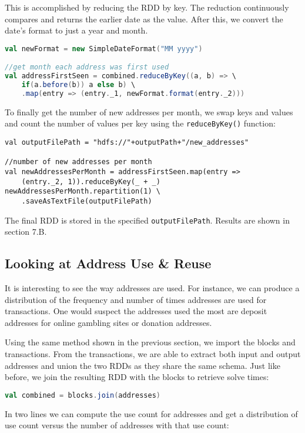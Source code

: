 \documentclass[9pt,twocolumn,twoside]{idsi}
\begin{document}
This is accomplished by reducing the RDD by key. The reduction continuously compares and returns the earlier date as the value. After this, we convert the date's format to just a year and month.

\begin{lstlisting}[language=Scala]
val newFormat = new SimpleDateFormat("MM yyyy")

//get month each address was first used
val addressFirstSeen = combined.reduceByKey((a, b) => \
    if(a.before(b)) a else b) \
    .map(entry => (entry._1, newFormat.format(entry._2)))
\end{lstlisting}

To finally get the number of new addresses per month, we swap keys and values and count the number of values per key using the \lstinline{reduceByKey()} function:

\begin{lstlisting}
val outputFilePath = "hdfs://"+outputPath+"/new_addresses"

//number of new addresses per month
val newAddressesPerMonth = addressFirstSeen.map(entry =>
    (entry._2, 1)).reduceByKey(_ + _)
newAddressesPerMonth.repartition(1) \
    .saveAsTextFile(outputFilePath)
\end{lstlisting}

The final RDD is stored in the specified \lstinline{outputFilePath}. Results are shown in section 7.B.

\subsection{Looking at Address Use \& Reuse}
It is interesting to see the way addresses are used. For instance, we can produce a distribution of the frequency and number of times addresses are used for transactions. One would suspect the addresses used the most are deposit addresses for online gambling sites or donation addresses.

Using the same method shown in the previous section, we import the blocks and transactions. From the transactions, we are able to extract both input and output addresses and union the two RDDs as they share the same schema. Just like before, we join the resulting RDD with the blocks to retrieve solve times:

\begin{lstlisting}[language=Scala]
val combined = blocks.join(addresses)
\end{lstlisting}

In two lines we can compute the use count for addresses and get a distribution of use count versus the number of addresses with that use count:
\end{document}
